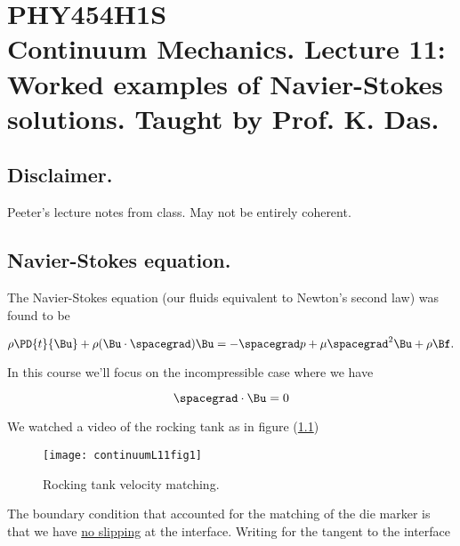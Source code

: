 
%

\chapter{PHY454H1S\\Continuum Mechanics.  Lecture 11: Worked examples of Navier-Stokes solutions.  Taught by Prof. K. Das.}
\label{chap:continuumL11}
{}
\date{Feb 15, 2012}

\beginArtWithToc

\section{Disclaimer.}

Peeter's lecture notes from class.  May not be entirely coherent.

\section{Navier-Stokes equation.}

The Navier-Stokes equation (our fluids equivalent to Newton's second law) was found to be

\begin{equation}\label{eqn:continuumL11:10}
\rho \PD{t}{\Bu} + \rho (\Bu \cdot \spacegrad) \Bu = - \spacegrad p + \mu \spacegrad^2 \Bu + \rho \Bf.
\end{equation}

In this course we'll focus on the incompressible case where we have

\begin{equation}\label{eqn:continuumL11:30}
\spacegrad \cdot \Bu = 0
\end{equation}

We watched a video of the rocking tank as in figure (\ref{fig:continuumL11:continuumL11fig1})
\begin{figure}[htp]
   \centering
   \texttt{[image: continuumL11fig1]}
   \caption{Rocking tank velocity matching.}\label{fig:continuumL11:continuumL11fig1}
\end{figure}

The boundary condition that accounted for the matching of the die marker is that we have \underline{no slipping} at the interface.  Writing for the tangent to the interface

